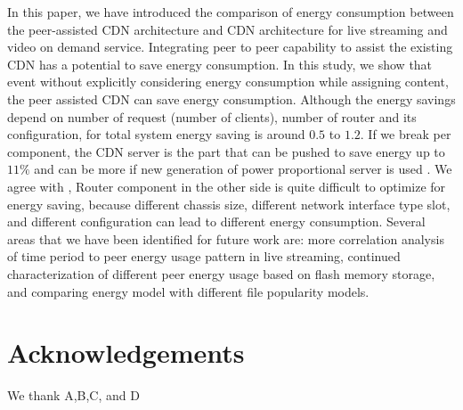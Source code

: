 \documentclass[conference]{IEEEtran}
\begin{document}
In this paper, we have introduced the comparison of energy consumption between the peer-assisted CDN architecture and CDN architecture for live streaming and video on demand service.
Integrating peer to peer capability to assist the existing CDN has a potential to save energy consumption.
In this study, we show that event without explicitly considering energy consumption while assigning content, the peer assisted CDN can save energy consumption.
Although the energy savings depend on number of request (number of clients), number of router and its configuration, for total system energy saving is around $0.5$ to $1.2$.
If we break per component, the CDN server is the part that can be pushed to save energy up to $11\%$ and can be more if new generation of power proportional server is used \cite{Krioukov:2011:NDI:1925861.1925878}.
We agree with \cite{4509688}, Router component in the other side is quite difficult to optimize for energy saving, because different chassis size, different network interface type slot, and different configuration can lead to different energy consumption.
Several areas that we have been identified for future work are: more correlation analysis of time period to peer energy usage pattern in live streaming, continued characterization of different peer energy usage based on flash memory storage, and comparing energy model with different file popularity models.


\section*{Acknowledgements}
We thank A,B,C, and D




%
%
%
%
\end{document}
